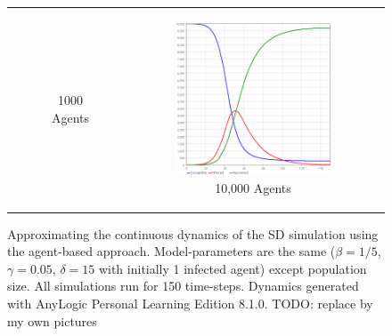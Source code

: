 \begin{figure}
\begin{center}
\begin{tabular}{c c c}
\begin{subfigure}[b]{0.3\textwidth}
			\caption{1000 Agents}
			\label{fig:pd_seq}
		\end{subfigure}
    	&
		\begin{subfigure}[b]{0.3\textwidth}
			\centering
			\includegraphics[width=.7\textwidth, angle=0]{./../shared/fig/SIR_ABS_ANYLOGIC_10000Agents.png}
			\caption{10,000 Agents}
			\label{fig:hac_seq}
		\end{subfigure}
	\end{tabular}
	
	\caption{\small Approximating the continuous dynamics of the SD simulation using the agent-based approach. Model-parameters are the same ($\beta = 1/5$, $\gamma = 0.05$, $\delta = 15$ with initially 1 infected agent) except population size. All simulations run for 150 time-steps. Dynamics generated with AnyLogic Personal Learning Edition 8.1.0. TODO: replace by my own pictures} 
	\label{fig:sir_abs_anylogic_agents}
\end{center}
\end{figure}

